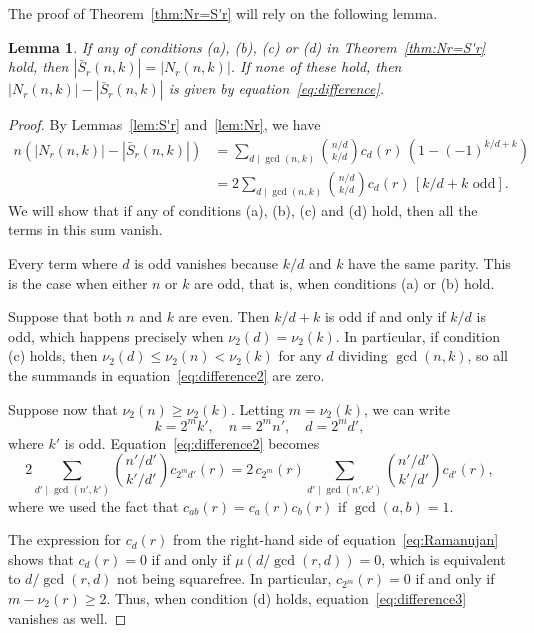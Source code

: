 \documentclass[12pt]{article}
\newcommand{\card}[1]{\left|#1\right|}
\newcommand{\bS}{\bar{S}}
\newtheorem{lemma}[theorem]{Lemma}
\theoremstyle{definition}
\begin{document}
The proof of Theorem~\ref{thm:Nr=S'r} will rely on the following lemma.

\begin{lemma}
    \label{lem:trivial-conditions}
    If any of conditions (a), (b), (c) or (d) in Theorem~\ref{thm:Nr=S'r} hold, then $\card{\bS_r(n, k)} = \card{N_r(n, k)}$.
    If none of these hold, then $\card{N_r(n, k)} - \card{\bS_r(n, k)}$ is given by equation~\eqref{eq:difference}.
\end{lemma}

\begin{proof}
    By Lemmas~\ref{lem:S'r} and~\ref{lem:Nr}, we have
    \begin{align} \nonumber
    n\left(\card{N_r(n,k)}-\card{\bS_r(n,k)}\right)&=
        \sum_{d \mid \gcd(n, k)} {n/d \choose k/d} c_d(r)\,\left(1 - (-1)^{k/d + k}\right)\\
        \label{eq:difference2}
        &=
        2\sum_{d \mid \gcd(n, k)} {n/d \choose k/d} c_d(r)\,[k / d + k \text{ odd}].
    \end{align}
    We will show that if any of conditions (a), (b), (c) and (d) hold, then all the terms in this sum vanish.

    Every term where $d$ is odd vanishes because $k/d$ and $k$ have the same parity. This is the case when either $n$ or $k$ are odd, that is, when conditions (a) or (b) hold.

    Suppose that both $n$ and $k$ are even. Then $k/d +
    k$ is odd if and only if $k/d$ is odd, which happens precisely when
    $\nu_2(d) = \nu_2(k)$. In particular, if condition (c) holds, then $\nu_2(d)
    \leq \nu_2(n) < \nu_2(k)$ for any $d$ dividing $\gcd(n,k)$, so all the summands in equation~\eqref{eq:difference2} are zero.

    Suppose now that $\nu_2(n) \geq \nu_2(k)$. Letting $m = \nu_2(k)$, we
    can write 
    \begin{equation}\label{eq:k'n'}
    k=2^m k', \quad n=2^m n', \quad  d=2^m d',
    \end{equation}
    where $k'$ is odd. Equation~\eqref{eq:difference2} becomes
    \begin{equation}\label{eq:difference3}
        2 \sum_{d' \mid \gcd(n', k')} {n'/d' \choose k'/d'} c_{2^m d'}(r)=2\, c_{2^m}(r) \sum_{d' \mid \gcd(n', k')} {n'/d' \choose k'/d'} c_{d'}(r),
    \end{equation}
    where we used the fact that $c_{ab}(r)=c_a(r)c_b(r)$ if $\gcd(a,b)=1$. 
    
    The expression for $c_{d}(r)$ from the right-hand side of equation~\eqref{eq:Ramanujan} shows that $c_{d}(r)=0$ if and only if  $\mu(d / \gcd(r, d))=0$, which is equivalent to $d / \gcd(r, d)$ not being squarefree. In particular, $c_{2^m}(r)=0$ if and only if $m - \nu_2(r) \geq 2$. Thus, when condition (d) holds, equation~\eqref{eq:difference3} vanishes as well.


\end{proof}
\end{document}
